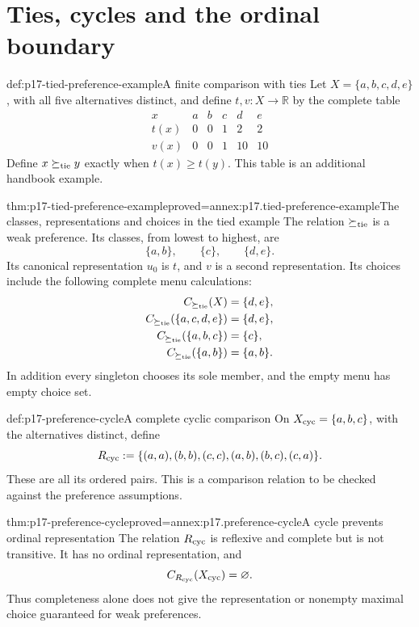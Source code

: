 \section{Ties, cycles and the ordinal boundary}
\label{sec:p17-preference-examples}

\begin{hbdefinition}{def:p17-tied-preference-example}{A finite comparison with ties}
Let \(X=\{a,b,c,d,e\}\), with all five alternatives distinct, and
define \(t,v:X\to\mathbb{R}\) by the complete table
\[
\begin{array}{c|rrrrr}
 x&a&b&c&d&e\\\hline
 t(x)&0&0&1&2&2\\
 v(x)&0&0&1&10&10
\end{array}
\]
Define \(x\succeq_{\rm tie}y\) exactly when \(t(x)\geq t(y)\).
This table is an additional handbook example.
\end{hbdefinition}

\begin{hbtheorem}{thm:p17-tied-preference-example}{proved=annex:p17.tied-preference-example}{The classes, representations and choices in the tied example}
The relation \(\succeq_{\rm tie}\) is a weak preference. Its classes,
from lowest to highest, are
\[
 \{a,b\},\qquad\{c\},\qquad\{d,e\}.
\]
Its canonical representation \(u_0\) is \(t\), and \(v\) is a
second representation. Its choices include the following complete menu
calculations:
\[
\begin{aligned}
 C_{\succeq_{\rm tie}}(X)&=\{d,e\},\\
 C_{\succeq_{\rm tie}}(\{a,c,d,e\})&=\{d,e\},\\
 C_{\succeq_{\rm tie}}(\{a,b,c\})&=\{c\},\\
 C_{\succeq_{\rm tie}}(\{a,b\})&=\{a,b\}.
\end{aligned}
\]
In addition every singleton chooses its sole member, and the empty menu
has empty choice set.
\end{hbtheorem}

\begin{hbdefinition}{def:p17-preference-cycle}{A complete cyclic comparison}
On \(X_{\rm cyc}=\{a,b,c\}\), with the alternatives distinct, define
\[
 R_{\rm cyc}\mathrel{:=}
 \{(a,a),(b,b),(c,c),(a,b),(b,c),(c,a)\}.
\]
These are all its ordered pairs. This is a comparison relation to be
checked against the preference assumptions.
\end{hbdefinition}

\begin{hbtheorem}{thm:p17-preference-cycle}{proved=annex:p17.preference-cycle}{A cycle prevents ordinal representation}
The relation \(R_{\rm cyc}\) is reflexive and complete but is not
transitive. It has no ordinal representation, and
\[
 C_{R_{\rm cyc}}(X_{\rm cyc})=\varnothing.
\]
Thus completeness alone does not give the representation or nonempty
maximal choice guaranteed for weak preferences.
\end{hbtheorem}

